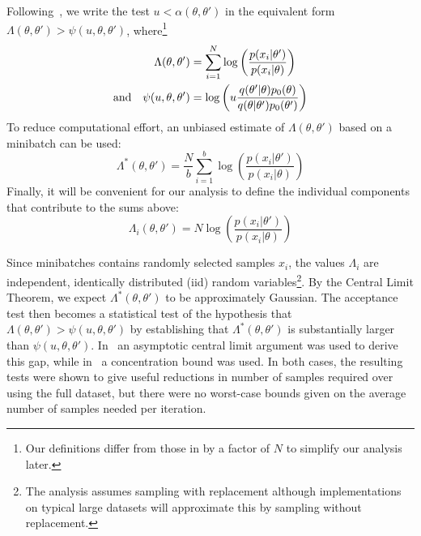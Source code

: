 \documentclass[twoside]{article} \usepackage{aistats2017}
\begin{document}
Following~\citet{icml2014c1_bardenet14}, we write the test $u <
\alpha(\theta,\theta')$ in the equivalent form $\Lambda(\theta,\theta') >
\psi(u,\theta,\theta')$, where\footnote{Our definitions differ from those in
\citet{icml2014c1_bardenet14} by a factor of $N$ to simplify our analysis later.}
\begin{equation}
\begin{split} 
\Lambda(\theta,\theta') & = \sum_{i=1}^N \log\left(\frac{p(x_i|\theta')}{p(x_i|\theta)}\right) \\  
{\rm and} \quad \psi(u,\theta,\theta') &= \log\left(u\frac{q(\theta'|\theta)p_0(\theta)}{q(\theta|\theta')p_0(\theta')}\right) \\
\end{split}
\end{equation}
To reduce computational effort, an unbiased estimate of $\Lambda(\theta,\theta')$
based on a minibatch can be used:
\begin{equation}
\Lambda^*(\theta,\theta') = \frac{N}{b}\sum_{i=1}^b \log\left(\frac{p(x_i|\theta')}{p(x_i|\theta)}\right)  
\end{equation}
Finally, it will be convenient for our analysis to define the individual
components that contribute to the sums above:
\begin{equation}\label{eq:individual_terms}
\Lambda_i(\theta,\theta') = N \log\left(\frac{p(x_i|\theta')}{p(x_i|\theta)}\right)  
\end{equation}

Since minibatches contains randomly selected samples $x_i$, the values
$\Lambda_i$ are independent, identically distributed (iid) random
variables\footnote{The analysis assumes sampling with replacement
although implementations on typical large datasets will approximate
this by sampling without replacement.}.
By the Central Limit Theorem, we expect $\Lambda^*(\theta,\theta')$ to
be approximately Gaussian. The acceptance test then becomes a
statistical test of the hypothesis that
$\Lambda(\theta,\theta')>\psi(u,\theta,\theta')$ by establishing that
$\Lambda^*(\theta,\theta')$ is substantially larger than
$\psi(u,\theta,\theta')$.  In~\citet{cutting_mh_2014} an asymptotic
central limit argument was used to derive this gap, while
in~\citet{icml2014c1_bardenet14} a concentration bound was used. In
both cases, the resulting tests were shown to give useful reductions
in number of samples required over using the full dataset, but there
were no worst-case bounds given on the average number of samples
needed per iteration.
\end{document}
